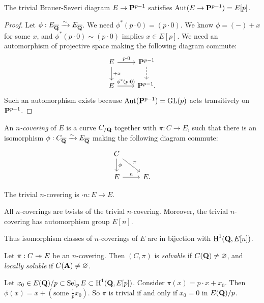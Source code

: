 \begin{lemma}
The trivial Brauer-Severi diagram $E\to \mathbf{P}^{p-1}$ satisfies 
$\operatorname{Aut}(E\to \mathbf{P}^{p-1})=E[p]$. 
\end{lemma}
\begin{proof}
Let $\phi:E_{\overline{\mathbf{Q}}}\xrightarrow\sim E_{\overline{\mathbf{Q}}}$. We need 
$\phi^\ast(p\cdot 0)=(p\cdot 0)$. We know $\phi=(-)+x$ for some $x$, and 
$\phi^\ast(p\cdot 0)\sim (p\cdot 0)$ implies $x\in E[p]$. We need an 
automorphism of projective space making the following diagram commute:
\[\begin{tikzcd}
  E \ar[r, "p\cdot 0"] \ar[d, "+x"] 
    & \dP^{p-1} \ar[d, dashrightarrow] \\
  E \ar[r, "\phi^\ast(p\cdot 0)"] 
    & \dP^{p-1} .
\end{tikzcd}\]
Such an automorphism exists because $\operatorname{Aut}(\mathbf{P}^{p-1})=\operatorname{GL}(p)$ acts 
transitively on $\mathbf{P}^{p-1}$. 
\end{proof}

\begin{definition}
An \emph{$n$-covering} of $E$ is a curve $C_{/\mathbf{Q}}$ together with 
$\pi:C\to E$, such that there is an isomorphism 
$\phi:C_{\overline{\mathbf{Q}}}\xrightarrow\sim E_{\overline{\mathbf{Q}}}$ making the following diagram 
commute: 
\[\begin{tikzcd}
  C \ar[d, "\phi"] \ar[dr, "\pi"] \\
  E \ar[r, "n"] 
    & E .
\end{tikzcd}\]
\end{definition}

The trivial $n$-covering is $\cdot n:E\to E$. 

\begin{lemma}
All $n$-coverings are twists of the trivial $n$-covering. Moreover, 
the trivial $n$-covering has automorphism group $E[n]$. 
\end{lemma}

Thus isomorphism classes of $n$-coverings of $E$ are in bijection with 
$\operatorname{H}^1(\mathbf{Q},E[n])$. 

\begin{definition}
Let $\pi:C\twoheadrightarrow E$ be an $n$-covering. Then $(C,\pi)$ is \emph{solvable} 
if $C(\mathbf{Q})\ne\varnothing$, and \emph{locally soluble} if 
$C(\mathbf{A})\ne\varnothing$. 
\end{definition}

Let $x_0\in E(\mathbf{Q})/p\subset \operatorname{Sel}_p E\subset \operatorname{H}^1(\mathbf{Q},E[p])$. Consider 
$\pi(x)=p\cdot x+x_0$. Then $\phi(x)=x+(\text{some }\frac 1 p x_0)$. So 
$\pi$ is trivial if and only if $x_0=0$ in $E(\mathbf{Q})/p$. 

